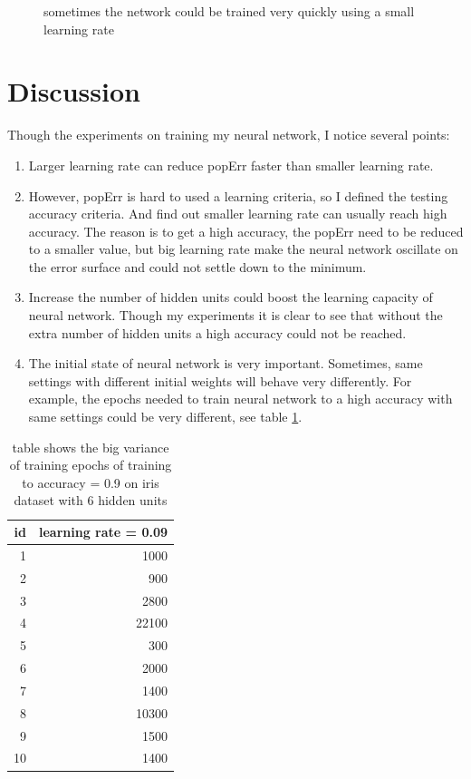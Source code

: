 \documentclass[11pt]{article}
\begin{document}
\begin{itemize}
\begin{figure}[htb]
\caption{sometimes the network could be trained very quickly using a small learning rate \label{fig-iris-6hidden-quick-learn}}
\end{figure}
\end{itemize}

\section{Discussion}
\label{sec-4}
Though the experiments on training my neural network, I notice several points:
\begin{enumerate}
\item Larger learning rate can reduce popErr faster than smaller learning rate.
\item However, popErr is hard to used a learning criteria, so I defined the testing accuracy criteria. And find out smaller learning rate can usually reach high accuracy. The reason is to get a high accuracy, the popErr need to be reduced to a smaller value, but big learning rate make the neural network oscillate on the error surface and could not settle down to the minimum.
\item Increase the number of hidden units could boost the learning capacity of neural network. Though my experiments it is clear to see that without the extra number of hidden units a high accuracy could not be reached.
\item The initial state of neural network is very important. Sometimes, same settings with different initial weights will behave very differently. For example, the epochs needed to train neural network to a high accuracy with same settings could be very different, see table \ref{table-epochs-variance-on-iris}.
\end{enumerate}
\begin{table}[htb]
\caption{table shows the big variance of training epochs of training to accuracy = 0.9 on iris dataset with 6 hidden units \label{table-epochs-variance-on-iris}}
\centering
\begin{tabular}{rr}
id & learning rate = 0.09\\
\hline
1 & 1000\\
2 & 900\\
3 & 2800\\
4 & 22100\\
5 & 300\\
6 & 2000\\
7 & 1400\\
8 & 10300\\
9 & 1500\\
10 & 1400\\
\hline
\end{tabular}
\end{table}
\end{document}
